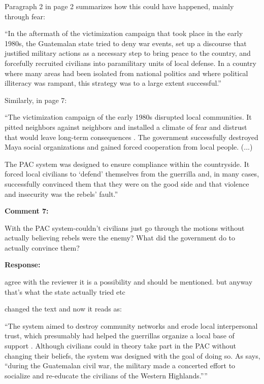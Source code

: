 \documentclass[12pt, a4paper, notitlepage]{article}
\begin{document}
Paragraph 2 in page 2 summarizes how this could have happened, mainly through fear:

``In the aftermath of the victimization campaign that took place in the early 1980s, the Guatemalan state tried to deny war events, set up a discourse that justified military actions as a necessary step to bring peace to the country, and forcefully recruited civilians into paramilitary units of local defense.
In a country where many areas had been isolated from national politics and where political illiteracy was rampant, this strategy was to a large extent successful.''

Similarly, in page 7:

``The victimization campaign of the early 1980s disrupted local communities. It pitted neighbors against neighbors and installed a climate of fear and distrust that would leave long-term consequences \citep{Burrell:2013aa}.
The government successfully destroyed Maya social organizations and gained forced cooperation from local people. (...)

The PAC system was designed to ensure compliance within the countryside.
It forced local civilians to `defend' themselves from the guerrilla and, in many cases, successfully convinced them that they were on the good side and that violence and insecurity was the rebels' fault.''

\vspace{15pt}
\noindent\textbf{Comment 7:}
\begin{displayquote}
With the PAC system-couldn't civilians just go through the motions without actually believing rebels were the enemy? What did the government do to actually convince them?
\end{displayquote}

\noindent\textbf{Response:}

agree with the reviewer it is a possibility and should be mentioned. but anyway that's what the state actually tried etc

changed the text and now it reads as:

``The system aimed to destroy community networks and erode local interpersonal trust, which presumably had helped the guerrillas organize a local base of support \citep{SaenzdeTejada:2004aa}.
Although civilians could in theory take part in the PAC without changing their beliefs, the system was designed with the goal of doing so.
As \citet[641]{Bateson:2017aa} says, ``during the Guatemalan civil war, the military made a concerted effort to socialize and re-educate the civilians of the Western Highlands.''''
\end{document}

